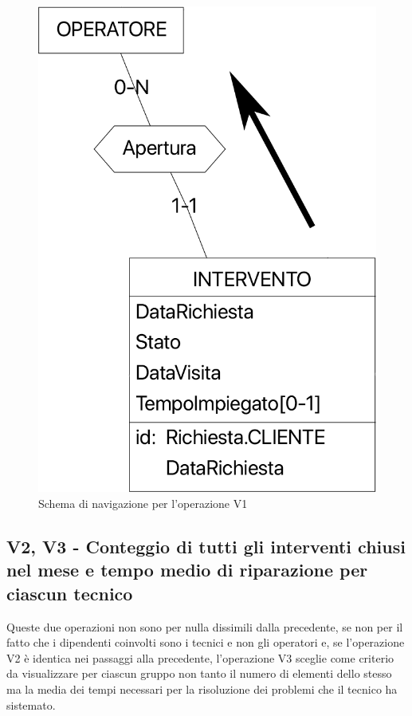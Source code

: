 \documentclass[a4paper, 12pt]{report}
\begin{document}
\begin{figure}[H]
	\centering
	\includegraphics{images/V1.png}
	\caption{Schema di navigazione per l'operazione V1}
\end{figure}

\subsection{V2, V3 - Conteggio di tutti gli interventi chiusi nel mese e tempo medio di riparazione per ciascun tecnico}

Queste due operazioni non sono per nulla dissimili dalla precedente, se non per il fatto che i dipendenti coinvolti sono i tecnici e non gli operatori e,
se l'operazione V2 è identica nei passaggi alla precedente, l'operazione V3 sceglie come criterio da visualizzare per ciascun gruppo non tanto il numero di
elementi dello stesso ma la media dei tempi necessari per la risoluzione dei problemi che il tecnico ha sistemato.
\end{document}
